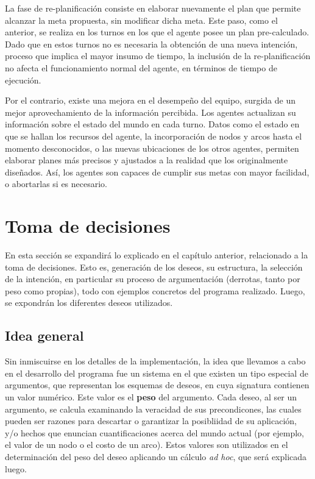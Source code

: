 \documentclass[oneside]{book}
\begin{document}

La fase de re-planificación consiste en elaborar nuevamente el plan que permite alcanzar 
la meta propuesta, sin modificar dicha meta. Este paso, como el anterior, se realiza en 
los turnos en los que el agente posee un plan pre-calculado. Dado que en estos turnos no 
es necesaria la obtención de una nueva intención, proceso que implica el mayor insumo de 
tiempo, la inclusión de la re-planificación no afecta el funcionamiento normal del agente, 
en términos de tiempo de ejecución. 

Por el contrario, existe una mejora en el desempeño del equipo, surgida de un mejor 
aprovechamiento de la información percibida. Los agentes actualizan su información sobre 
el estado del mundo en cada turno. Datos como el estado en que se hallan los recursos del 
agente, la incorporación de nodos y arcos hasta el momento desconocidos, o las nuevas 
ubicaciones de los otros agentes, permiten elaborar planes más precisos y ajustados a la 
realidad que los originalmente diseñados. Así, los agentes son capaces de cumplir sus 
metas con mayor facilidad, o abortarlas si es necesario.


\chapter{Toma de decisiones}

En esta sección se expandirá lo explicado en el capítulo anterior, relacionado a 
la toma de decisiones. Esto es, generación de los deseos, su estructura, la selección de la
intención, en particular su proceso de argumentación (derrotas, tanto por peso como 
propias), todo con ejemplos concretos del programa realizado. Luego, se expondrán los 
diferentes deseos utilizados.


\section{Idea general}

\label{sec:ideaGeneral}

Sin inmiscuirse en los detalles de la implementación, la idea que llevamos a cabo en el 
desarrollo del programa fue un sistema en el que existen un tipo especial de argumentos,
que representan los esquemas de deseos, en cuya signatura contienen un valor numérico.
Este valor es el \textbf{peso} %
del argumento. Cada deseo, al ser un argumento, se calcula examinando la veracidad de sus
precondicones, las cuales pueden ser razones para descartar o garantizar la posibliidad de
su aplicación, y/o hechos que enuncian cuantificaciones acerca del mundo actual (por 
ejemplo, el valor de un nodo o el costo de un arco). Estos valores son utilizados en el
determinación del peso del deseo aplicando un cálculo \textit{ad hoc}, %
que será explicada luego.
\end{document}

